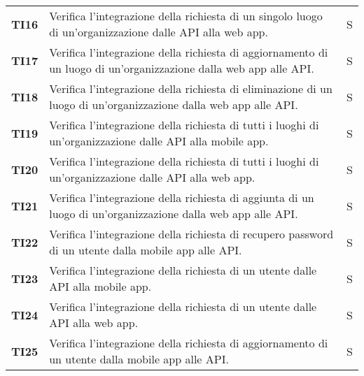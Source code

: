 \documentclass[../../piano-di-qualifica.tex]{subfiles}
\begin{document}
\begin{longtable}[H]{>{\centering\bfseries}m{3cm} >{}m{10cm} >{\centering\arraybackslash}m{3cm}}
  TI16               & Verifica l'integrazione della richiesta di un singolo luogo di un'organizzazione dalle API alla web app.                                      & S                             \\

  TI17               & Verifica l'integrazione della richiesta di aggiornamento di un luogo di un'organizzazione dalla web app alle API\@.                           & S                             \\

  TI18               & Verifica l'integrazione della richiesta di eliminazione di un luogo di un'organizzazione dalla web app alle API\@.                            & S                             \\

  TI19               & Verifica l'integrazione della richiesta di tutti i luoghi di un'organizzazione dalle API alla mobile app.                                     & S                             \\

  TI20               & Verifica l'integrazione della richiesta di tutti i luoghi di un'organizzazione dalle API alla web app.                                        & S                             \\

  TI21               & Verifica l'integrazione della richiesta di aggiunta di un luogo di un'organizzazione dalla web app alle API\@.                                & S                             \\

  TI22               & Verifica l'integrazione della richiesta di recupero password di un utente dalla mobile app alle API\@.                                        & S                             \\

  TI23               & Verifica l'integrazione della richiesta di un utente dalle API alla mobile app.                                                               & S                             \\

  TI24               & Verifica l'integrazione della richiesta di un utente dalle API alla web app.                                                                  & S                             \\

  TI25               & Verifica l'integrazione della richiesta di aggiornamento di un utente dalla mobile app alle API\@.                                            & S                             \\


\end{longtable}
\end{document}
